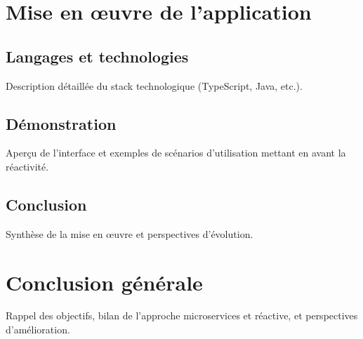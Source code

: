 \documentclass[12pt,a4paper]{report}
\begin{document}
\chapter{Mise en œuvre de l’application}

\section{Langages et technologies}
Description détaillée du stack technologique (TypeScript, Java, etc.).

\section{Démonstration}
Aperçu de l’interface et exemples de scénarios d’utilisation mettant en avant la réactivité.

\section*{Conclusion}
Synthèse de la mise en œuvre et perspectives d’évolution.

\chapter*{Conclusion générale}
Rappel des objectifs, bilan de l’approche microservices et réactive, et perspectives d’amélioration.
\end{document}
